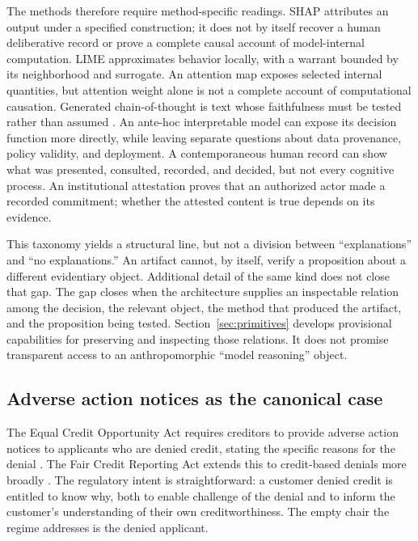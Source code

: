 The methods therefore require method-specific readings. SHAP attributes an output under a specified construction; it does not by itself recover a human deliberative record or prove a complete causal account of model-internal computation. LIME approximates behavior locally, with a warrant bounded by its neighborhood and surrogate. An attention map exposes selected internal quantities, but attention weight alone is not a complete account of computational causation. Generated chain-of-thought is text whose faithfulness must be tested rather than assumed \parencite{lanham2023,turpin2023}. An ante-hoc interpretable model can expose its decision function more directly, while leaving separate questions about data provenance, policy validity, and deployment. A contemporaneous human record can show what was presented, consulted, recorded, and decided, but not every cognitive process. An institutional attestation proves that an authorized actor made a recorded commitment; whether the attested content is true depends on its evidence.

This taxonomy yields a structural line, but not a division between ``explanations'' and ``no explanations.'' An artifact cannot, by itself, verify a proposition about a different evidentiary object. Additional detail of the same kind does not close that gap. The gap closes when the architecture supplies an inspectable relation among the decision, the relevant object, the method that produced the artifact, and the proposition being tested. Section~\ref{sec:primitives} develops provisional capabilities for preserving and inspecting those relations. It does not promise transparent access to an anthropomorphic ``model reasoning'' object.

\subsection{Adverse action notices as the canonical case}
\label{sec:verification-regimes:adverse-action-notices}

The Equal Credit Opportunity Act requires creditors to provide adverse action notices to applicants who are denied credit, stating the specific reasons for the denial \parencite{regB1002_9}. The Fair Credit Reporting Act extends this to credit-based denials more broadly \parencite{fcraAdverseAction}. The regulatory intent is straightforward: a customer denied credit is entitled to know why, both to enable challenge of the denial and to inform the customer's understanding of their own creditworthiness. The empty chair the regime addresses is the denied applicant.

